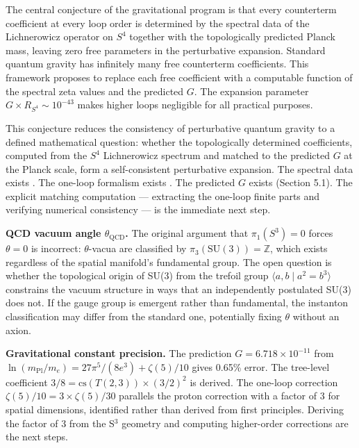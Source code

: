 The central conjecture of the gravitational program is that every counterterm coefficient at every loop order is determined by the spectral data of the Lichnerowicz operator on $S^4$ together with the topologically predicted Planck mass, leaving zero free parameters in the perturbative expansion. Standard quantum gravity has infinitely many free counterterm coefficients. This framework proposes to replace each free coefficient with a computable function of the spectral zeta values and the predicted $G$. The expansion parameter $G \times R_{S^4} \sim 10^{-43}$ makes higher loops negligible for all practical purposes.

This conjecture reduces the consistency of perturbative quantum gravity to a defined mathematical question: whether the topologically determined coefficients, computed from the $S^4$ Lichnerowicz spectrum and matched to the predicted $G$ at the Planck scale, form a self-consistent perturbative expansion. The spectral data exists \cite{camporesi1994}. The one-loop formalism exists \cite{christensenduff1979}. The predicted $G$ exists (Section 5.1). The explicit matching computation --- extracting the one-loop finite parts and verifying numerical consistency --- is the immediate next step.




\item \textbf{QCD vacuum angle $\theta_{\mathrm{QCD}}$.} The original argument that $\pi_1(S^3) = 0$ forces $\theta = 0$ is incorrect: $\theta$-vacua are classified by $\pi_3(\mathrm{SU}(3)) = \mathbb{Z}$, which exists regardless of the spatial manifold's fundamental group. The open question is whether the topological origin of SU(3) from the trefoil group $\langle a, b \mid a^2 = b^3 \rangle$ constrains the vacuum structure in ways that an independently postulated SU(3) does not. If the gauge group is emergent rather than fundamental, the instanton classification may differ from the standard one, potentially fixing $\theta$ without an axion.


\item \textbf{Gravitational constant precision.} The prediction $G = 6.718 \times 10^{-11}$ from $\ln(m_{\text{Pl}}/m_e) = 27\pi^5/(8e^3) + \zeta(5)/10$ gives 0.65\% error. The tree-level coefficient $3/8 = \mathrm{cs}(T(2,3)) \times (3/2)^2$ is derived. The one-loop correction $\zeta(5)/10 = 3 \times \zeta(5)/30$ parallels the proton correction with a factor of 3 for spatial dimensions, identified rather than derived from first principles. Deriving the factor of 3 from the S$^3$ geometry and computing higher-order corrections are the next steps.

